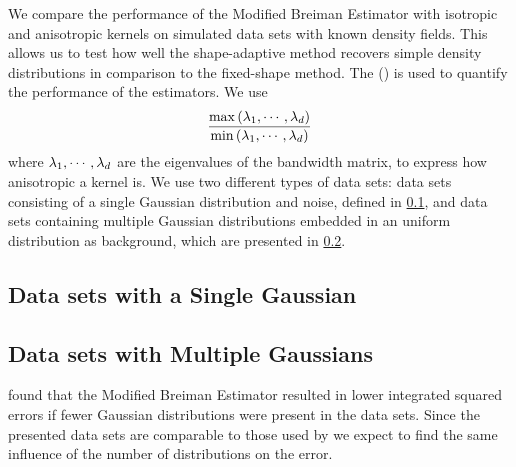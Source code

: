 We compare the performance of the Modified Breiman Estimator with isotropic and anisotropic kernels on simulated data sets with known density fields. This allows us to test how well the shape-adaptive method recovers simple density distributions in comparison to the fixed-shape method. 
The \mse (\MSE) is used to quantify the performance of the estimators. We use
\begin{equation*}\label{eq:experiment:anisotropicmetric}
	\frac{\max\left(\lambda_1, \cdots, \lambda_d \right)}{\min\left(\lambda_1, \cdots, \lambda_d \right)}
\end{equation*}
where $\lambda_1, \cdots, \lambda_d$ are the eigenvalues of the bandwidth matrix, to express how anisotropic a kernel is.
We use two different types of data sets: data sets consisting of a single Gaussian distribution and noise, defined in \cref{s:experiment:singlesphere},  and data sets containing multiple Gaussian distributions embedded in an uniform distribution as background, which are presented in \cref{s:experiment:multisphere}.

\subsection{Data sets with a Single Gaussian}
\label{s:experiment:singlesphere}


\subsection{Data sets with Multiple Gaussians}
\label{s:experiment:multisphere}


\textcite{ferdosi2011comparison} found that the Modified Breiman Estimator resulted in lower integrated squared errors if fewer Gaussian distributions were present in the data sets. Since the presented data sets are comparable to those used by \citeauthor{ferdosi2011comparison} we expect to find the same influence of the number of distributions on the error.
